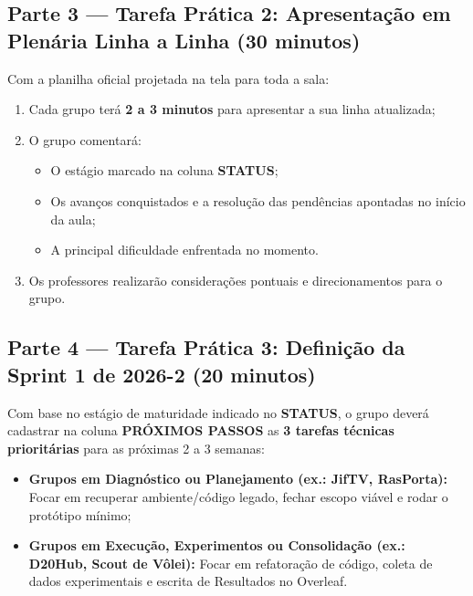 \subsection{Parte 3 — Tarefa Prática 2: Apresentação em Plenária Linha a Linha (30 minutos)}

\begin{boxAtividade}

Com a planilha oficial projetada na tela para toda a sala:

\begin{enumerate}
\item Cada grupo terá \textbf{2 a 3 minutos} para apresentar a sua linha atualizada;
\item O grupo comentará:
  \begin{itemize}
      \item O estágio marcado na coluna \textbf{STATUS};
      \item Os avanços conquistados e a resolução das pendências apontadas no início da aula;
      \item A principal dificuldade enfrentada no momento.
  \end{itemize}
\item Os professores realizarão considerações pontuais e direcionamentos para o grupo.
\end{enumerate}

\end{boxAtividade}


\subsection{Parte 4 — Tarefa Prática 3: Definição da Sprint 1 de 2026-2 (20 minutos)}

\begin{boxAtividade}

Com base no estágio de maturidade indicado no \textbf{STATUS}, o grupo deverá cadastrar na coluna \textbf{PRÓXIMOS PASSOS} as \textbf{3 tarefas técnicas prioritárias} para as próximas 2 a 3 semanas:

\begin{itemize}
\item \textbf{Grupos em Diagnóstico ou Planejamento (ex.: JifTV, RasPorta):} Focar em recuperar ambiente/código legado, fechar escopo viável e rodar o protótipo mínimo;
\item \textbf{Grupos em Execução, Experimentos ou Consolidação (ex.: D20Hub, Scout de Vôlei):} Focar em refatoração de código, coleta de dados experimentais e escrita de Resultados no Overleaf.
\end{itemize}

\end{boxAtividade}

